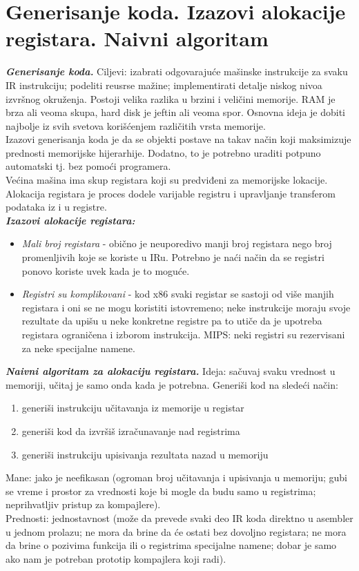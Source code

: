 \documentclass[10pt]{extarticle}
\begin{document}
\section{Generisanje koda. Izazovi alokacije registara. Naivni algoritam}
\noindent
\textit{\textbf{Generisanje koda.}} Ciljevi: izabrati odgovarajuće mašinske instrukcije za svaku IR instrukciju; podeliti reusrse mažine; implementirati detalje niskog nivoa izvršnog okruženja. Postoji velika razlika u brzini i veličini memorije. RAM je brza ali veoma skupa, hard disk je jeftin ali veoma spor. Osnovna ideja je dobiti najbolje iz svih svetova korišćenjem različitih vrsta memorije.\\
Izazovi generisanja koda je da se objekti postave na takav način koji maksimizuje prednosti memorijske hijerarhije. Dodatno, to je potrebno uraditi potpuno automatski tj. bez pomoći programera.\\
Većina mašina ima skup registara koji su predviđeni za memorijske lokacije. Alokacija registara je proces dodele varijable registru i upravljanje transferom podataka iz i u registre. \\
\textit{\textbf{Izazovi alokacije registara:}}
\begin{itemize}
    \item \textit{Mali broj registara} - obično je neuporedivo manji broj registara nego broj promenljivih koje se koriste u IRu. Potrebno je naći način da se registri ponovo koriste uvek kada je to moguće.
    \item \textit{Registri su komplikovani} - kod x86 svaki registar se sastoji od više manjih registara i oni se ne mogu koristiti istovremeno; neke instrukcije moraju svoje rezultate da upišu u neke konkretne registre pa to utiče da je upotreba registara ograničena i izborom instrukcija. MIPS: neki registri su rezervisani za neke specijalne namene.
\end{itemize}
\textit{\textbf{Naivni algoritam za alokaciju registara.}} Ideja: sačuvaj svaku vrednost u memoriji, učitaj je samo onda kada je potrebna. Generiši kod na sledeći način:
\begin{enumerate}
    \item generiši instrukciju učitavanja iz memorije u registar
    \item generiši kod da izvršiš izračunavanje nad registrima
    \item generiši instrukciju upisivanja rezultata nazad u memoriju
\end{enumerate}
Mane: jako je neefikasan (ogroman broj učitavanja i upisivanja u memoriju; gubi se vreme i prostor za vrednosti koje bi mogle da budu samo u registrima; neprihvatljiv pristup za kompajlere).\\
Prednosti: jednostavnost (može da prevede svaki deo IR koda direktno u asembler u jednom prolazu; ne mora da brine da će ostati bez dovoljno registara; ne mora da brine o pozivima funkcija ili o registrima specijalne namene; dobar je samo ako nam je potreban prototip kompajlera koji radi).
\end{document}
